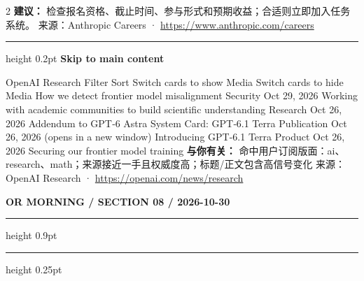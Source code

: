 \documentclass[10.5pt]{ctexart}
\begin{document}
\begin{multicols}{2}
\textbf{建议：} 检查报名资格、截止时间、参与形式和预期收益；合适则立即加入任务系统。
{\footnotesize\color{ormuted} 来源：Anthropic Careers · \url{https://www.anthropic.com/careers}}
\vspace{2mm}
\hrule height 0.2pt
\vspace{2mm}
{\large\bfseries Skip to main content}\par
OpenAI Research Filter Sort Switch cards to show Media Switch cards to hide Media How we detect frontier model misalignment Security Oct 29, 2026 Working with academic communities to build scientific understanding Research Oct 26, 2026 Addendum to GPT‑6 Astra System Card: GPT‑6.1 Terra Publication Oct 26, 2026 (opens in a new window) Introducing GPT-6.1 Terra Product Oct 26, 2026 Securing our frontier model training 
\textbf{与你有关：} 命中用户订阅版面：ai、research、math；来源接近一手且权威度高；标题/正文包含高信号变化
{\footnotesize\color{ormuted} 来源：OpenAI Research · \url{https://openai.com/news/research}}
\end{multicols}
\newpage
{\small\bfseries OR MORNING / SECTION 08 / 2026-10-30}
\vspace{2mm}
\hrule height 0.9pt
\vspace{1.5mm}
\hrule height 0.25pt
\vspace{4mm}
\end{document}
